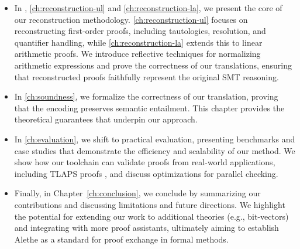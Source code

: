\begin{itemize}
\item In , \ref{ch:reconstruction-ul} and \ref{ch:reconstruction-la}, we present the core of our reconstruction methodology.
    \cref{ch:reconstruction-ul} focuses on reconstructing first-order proofs, including tautologies, resolution, and quantifier handling, while \cref{ch:reconstruction-la} extends this to linear arithmetic proofs.
    We introduce reflective techniques for normalizing arithmetic expressions and prove the correctness of our translations, ensuring that reconstructed proofs faithfully represent the original SMT reasoning.

\item In \cref{ch:soundness}, we formalize the correctness of our translation, proving that the encoding preserves semantic entailment.
    This chapter provides the theoretical guarantees that underpin our approach.

\item In \cref{ch:evaluation}, we shift to practical evaluation, presenting benchmarks and case studies that demonstrate the efficiency and scalability of our method.
    We show how our toolchain can validate proofs from real-world applications, including TLAPS proofs \cite{tla-proofs}, and discuss optimizations for parallel checking.

\item Finally, in Chapter~\cref{ch:conclusion}, we conclude by summarizing our contributions and discussing limitations and future directions.
    We highlight the potential for extending our work to additional theories (e.g., bit-vectors) and integrating with more proof assistants, ultimately aiming to establish Alethe as a standard for proof exchange in formal methods.
\end{itemize}
